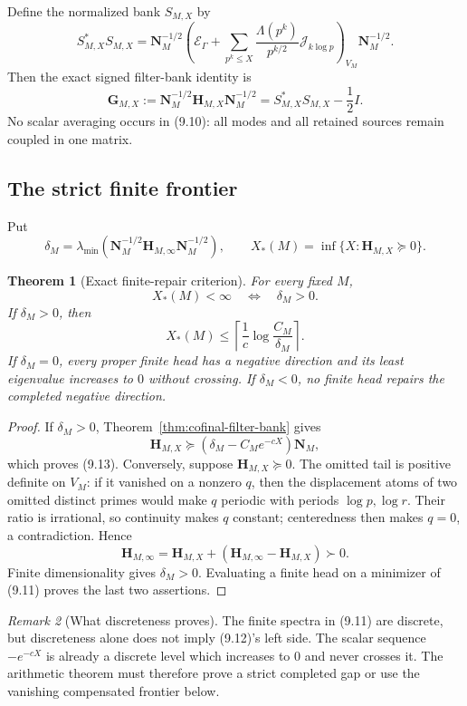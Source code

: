 \documentclass[11pt]{amsart}
\newtheorem{theorem}{Theorem}[section]
\theoremstyle{definition}
\theoremstyle{remark}
\newtheorem{remark}[theorem]{Remark}
\begin{document}
Define the normalized bank \(S_{M,X}\) by
\[
 S_{M,X}^*S_{M,X}
 =\mathbf N_M^{-1/2}
  \left(\mathscr E_\Gamma+
  \sum_{p^k\le X}\frac{\Lambda(p^k)}{p^{k/2}}
       \mathcal J_{k\log p}\right)_{V_M}
 \mathbf N_M^{-1/2}.
\tag{9.9}
\]
Then the exact signed filter-bank identity is
\[
 \boxed{
 \mathbf G_{M,X}:=
 \mathbf N_M^{-1/2}\mathbf H_{M,X}\mathbf N_M^{-1/2}
 =S_{M,X}^*S_{M,X}-\frac12I.}
\tag{9.10}
\]
No scalar averaging occurs in (9.10): all modes and all retained sources
remain coupled in one matrix.

\subsection{The strict finite frontier}

Put
\[
 \delta_M=
 \lambda_{\min}\!\left(
 \mathbf N_M^{-1/2}\mathbf H_{M,\infty}
 \mathbf N_M^{-1/2}\right),
\qquad
 X_*(M)=\inf\{X:\mathbf H_{M,X}\succeq0\}.
\tag{9.11}
\]

\begin{theorem}[Exact finite-repair criterion]
\label{thm:exact-finite-repair}
For every fixed \(M\),
\[
 \boxed{X_*(M)<\infty\quad\Longleftrightarrow\quad\delta_M>0.}
\tag{9.12}
\]
If \(\delta_M>0\), then
\[
 X_*(M)\le
 \left\lceil\frac1c\log\frac{C_M}{\delta_M}\right\rceil .
\tag{9.13}
\]
If \(\delta_M=0\), every proper finite head has a negative direction and
its least eigenvalue increases to \(0\) without crossing.  If
\(\delta_M<0\), no finite head repairs the completed negative direction.
\end{theorem}

\begin{proof}
If \(\delta_M>0\), Theorem~\ref{thm:cofinal-filter-bank} gives
\[
 \mathbf H_{M,X}\succeq
 (\delta_M-C_Me^{-cX})\mathbf N_M,
\]
which proves (9.13).  Conversely, suppose
\(\mathbf H_{M,X}\succeq0\).  The omitted tail is positive definite on
\(V_M\): if it vanished on a nonzero \(q\), then the displacement atoms
of two omitted distinct primes would make \(q\) periodic with periods
\(\log p,\log r\).  Their ratio is irrational, so continuity makes \(q\)
constant; centeredness then makes \(q=0\), a contradiction.  Hence
\[
 \mathbf H_{M,\infty}
 =\mathbf H_{M,X}
  +(\mathbf H_{M,\infty}-\mathbf H_{M,X})\succ0.
\]
Finite dimensionality gives \(\delta_M>0\).  Evaluating a finite head on a
minimizer of (9.11) proves the last two assertions.
\end{proof}

\begin{remark}[What discreteness proves]
The finite spectra in (9.11) are discrete, but discreteness alone does not
imply (9.12)'s left side.  The scalar sequence \(-e^{-cX}\) is already a
discrete level which increases to \(0\) and never crosses it.  The
arithmetic theorem must therefore prove a strict completed gap or use the
vanishing compensated frontier below.
\end{remark}
\end{document}

